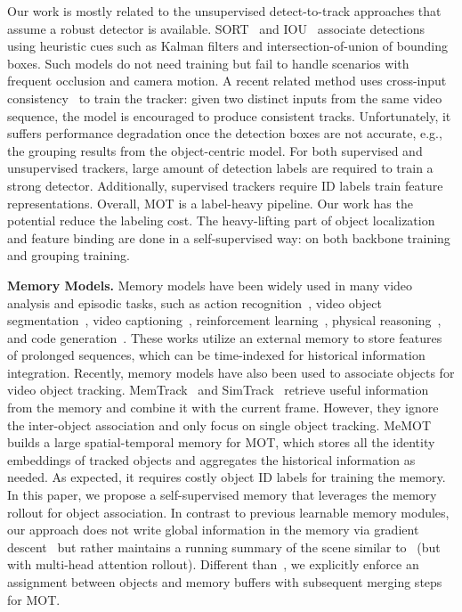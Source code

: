 Our work is mostly related to the unsupervised detect-to-track approaches that assume a robust detector is available. SORT~\cite{bewley2016simple} and IOU~\cite{bochinski2017high} associate detections using heuristic cues such as Kalman filters and intersection-of-union of bounding boxes. Such models do not need training but fail to handle scenarios with frequent occlusion and camera motion. A recent related method uses cross-input consistency~\cite{bastani2021self} to train the tracker: given two distinct inputs from the same video sequence, the model is encouraged to produce consistent tracks. Unfortunately, it suffers performance degradation once the detection boxes are not accurate, e.g., the grouping results from the object-centric model. 
For both supervised and unsupervised trackers, large amount of detection labels are required to train a strong detector. Additionally, supervised trackers require ID labels train feature representations. Overall, MOT is a label-heavy pipeline. Our work has the potential reduce the labeling cost. The heavy-lifting part of object localization and feature binding are done in a self-supervised way: on both backbone training and grouping training. 


\textbf{Memory Models.} Memory models have been widely used in many video analysis and episodic tasks, such as  action recognition~\cite{wu2019long,jin2021temporal}, video object segmentation~\cite{lu2020video,oh2019video,lai2020mast}, video captioning~\cite{pei2019memory}, reinforcement learning~\cite{goyal2022retrieval}, physical reasoning~\cite{alias2021neural}, and code generation~\cite{liu2021retrieval}. These works utilize an external memory to store  features of prolonged sequences, which can be time-indexed for historical information integration. Recently, memory models have also been used to associate objects for video object tracking. MemTrack~\cite{yang2018learning} and SimTrack~\cite{fu2021stmtrack} retrieve useful information from the memory and combine it with the current frame. However,  they ignore the inter-object association and only focus on single object tracking. MeMOT~\cite{cai2022memot} builds a large spatial-temporal memory for MOT, which stores all the identity embeddings of tracked objects and aggregates the historical information as needed. As expected, it requires costly object ID labels for training the memory. In this paper, we propose a self-supervised memory that leverages the memory rollout for object association. In contrast to previous learnable memory modules, our approach does not write global information in the memory via gradient descent~\cite{trauble2022discrete} but rather maintains a running summary of the scene similar to~\cite{Goyal2021RIMs} (but with multi-head attention rollout). Different than~\cite{Goyal2021RIMs}, we explicitly enforce an assignment between objects and memory buffers with subsequent merging steps for MOT. 